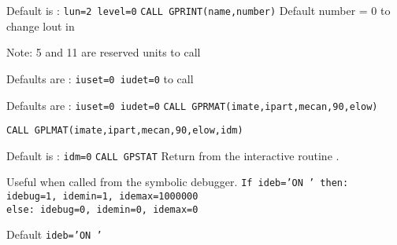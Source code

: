 Default is : {\tt lun=2  level=0}
{\tt CALL GPRINT(name,number)}
Default number = 0
to change lout in 
 
Note: 5 and 11 are reserved units
to call 
 
Defaults are : {\tt iuset=0  iudet=0}
to call 
 
Defaults are : {\tt iuset=0  iudet=0}
{\tt CALL GPRMAT(imate,ipart,mecan,90,elow)}
 
{\tt  CALL GPLMAT(imate,ipart,mecan,90,elow,idm)}
 
Default is : {\tt idm=0}
{\tt  CALL GPSTAT}
Return from the interactive routine .
 
Useful when called from the symbolic debugger.
{\tt If ideb='ON  ' then: idebug=1, idemin=1, idemax=1000000}\\
{\tt                else: idebug=0, idemin=0, idemax=0}
 
Default {\tt ideb='ON  '}
 
 

